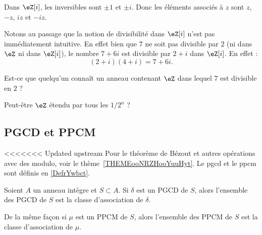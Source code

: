 \begin{example}
    Dans \( \eZ[i]\), les inversibles sont \( \pm 1\) et \( \pm i\). Donc les éléments associés à \( z\) sont \( z\), \( -z\), \( iz\) et \( -iz\).

    Notons au passage que la notion de divisibilité dans \( \eZ[i]\) n'est pas immédiatement intuitive. En effet bien que \( 7\) ne soit pas divisible par \( 2\) (ni dans \( \eZ\) ni dans \( \eZ[i]\)), le nombre \( 7+6i\) est divisible par \( 2+i\) dans \( \eZ[i]\). En effet :
    \begin{equation}
        (2+i)(4+i)=7+6i.
    \end{equation}
\end{example}

\begin{probleme}
    Est-ce que quelqu'un connaît un anneau contenant \( \eZ\) dans lequel \( 7\) est divisible en \( 2\) ?

    Peut-être \( \eZ\) étendu par tous les \( 1/2^n\) ?
\end{probleme}

\subsection{PGCD et PPCM}

<<<<<<< Updated upstream
Pour le théorème de Bézout et autres opérations avec des modulo, voir le thème~\ref{THEMEooNRZHooYuuHyt}. Le pgcd et le ppcm sont définis en \ref{DefrYwbct}.

\begin{lemma}
    Soient \( A\) un anneau intègre et \( S\subset A\). Si \( \delta\) est un PGCD de \( S\), alors l'ensemble des PGCD de \( S\) est la classe d'association de \( \delta\).

    De la même façon si \( \mu\) est un PPCM de \( S\), alors l'ensemble des PPCM de \( S\) est la classe d'association de \( \mu\).
\end{lemma}


